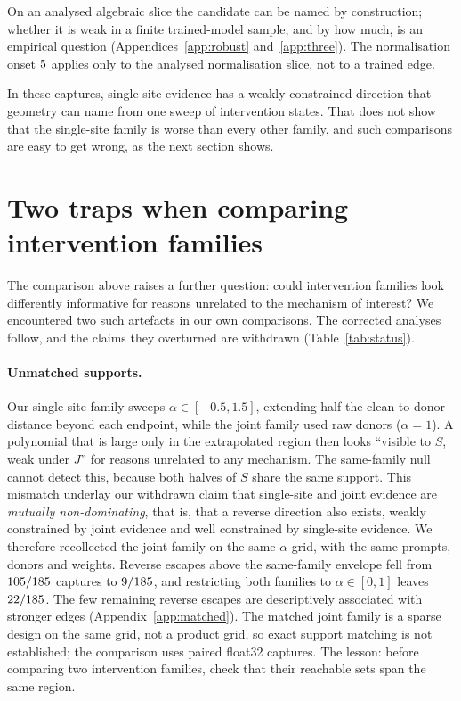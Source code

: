 \documentclass{article}
\theoremstyle{plain}
\theoremstyle{definition}
\begin{document}
On an analysed algebraic slice the candidate can be named by construction; whether it is weak in a finite trained-model sample, and by how much, is an empirical question (Appendices~\ref{app:robust} and~\ref{app:three}). The normalisation onset $5$ applies only to the analysed normalisation slice, not to a trained edge.

In these captures, single-site evidence has a weakly constrained direction that geometry can name from one sweep of
intervention states. That does not show that the single-site family is worse than every other family, and such
comparisons are easy to get wrong, as the next section shows.

\section{Two traps when comparing intervention families}
\label{sec:pitfalls}

The comparison above raises a further question: could intervention families look differently informative for reasons
unrelated to the mechanism of interest? We encountered two such artefacts in our own comparisons. The corrected analyses follow, and the claims they overturned are
withdrawn (Table~\ref{tab:status}).

\paragraph{Unmatched supports.} Our single-site family sweeps $\alpha\in[-0.5,1.5]$, extending half the clean-to-donor
distance beyond each endpoint, while the joint family used raw donors ($\alpha=1$). A polynomial that is large only in
the extrapolated region then looks ``visible to $S$, weak under $J$'' for reasons unrelated to any mechanism. The
same-family null cannot detect this, because both halves of $S$ share the same support. This mismatch underlay our withdrawn claim that single-site and joint evidence are \emph{mutually non-dominating},
that is, that a reverse direction also exists, weakly constrained by joint evidence and well constrained by
single-site evidence. We therefore recollected the joint family
on the same $\alpha$ grid, with the same prompts, donors and weights. Reverse escapes above the same-family envelope
fell from $105/185$ captures to $9/185$, and restricting both families to $\alpha\in[0,1]$
leaves $22/185$. The few remaining reverse escapes are descriptively associated with stronger edges
(Appendix~\ref{app:matched}). The matched joint family is a sparse design on the same grid, not a product grid, so
exact support matching is not established; the comparison uses paired float32 captures. The lesson: before comparing
two intervention families, check that their reachable sets span the same region. 
\end{document}
